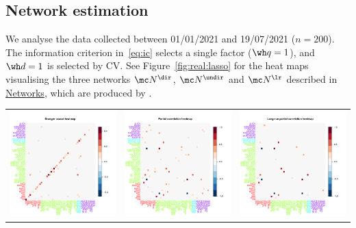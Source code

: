 \subsection{Network estimation}
\label{sec:real:network}
 
We analyse the data collected between 01/01/2021 and 19/07/2021 ($n = 200$).
The information criterion in~\eqref{eq:ic} selects a single factor ($\wh q = 1$), and $\wh d =1 $ is selected by CV. 
See Figure~\ref{fig:real:lasso} for the heat maps visualising the three networks $\mc N^{\dir}$, $\mc N^{\undir}$ and $\mc N^{\lr}$ described in \hyperref[sec:networks]{Networks}, which are produced by .

\begin{widefigure}[htbp!]
\centering
\begin{tabular}{ccc}
\includegraphics[width = .3\textwidth]{figs/granger_1.pdf} 
&\includegraphics[width = .3\textwidth]{figs/delta_1.pdf} 
&\includegraphics[width = .3\textwidth]{figs/omega_1.pdf} 
\end{tabular}
\caption{Heat maps of the three networks underlying the energy price data collected over the period 01/01/2021--19/07/2021. 
Left: $\mc N^{\dir}$ obtained with the Lasso estimator~\eqref{eq:lasso} combined with the adaptive threshold $\mathfrak{t}_{\text{ada}}$. Middle: $\mc N^{\undir}$ obtained with the ACLIME estimator of $\bm\Delta$. Right: $\mc N^{\lr}$ obtained by combining the estimators of VAR parameters and $\bm\Delta$.
In the axis labels, Zone-type nodes are coloured in red, 
Aggregate-types in green, 
Hub-types in blue
and EHV-types in purple.}
\label{fig:real:lasso}
\end{widefigure}

